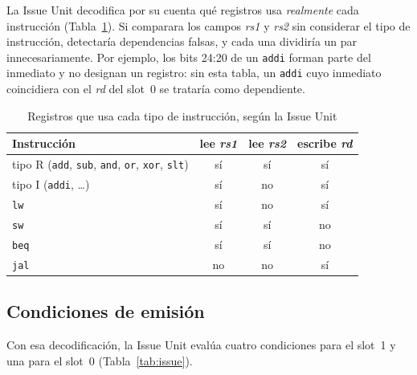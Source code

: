 \documentclass[11pt,a4paper]{article}
\newcommand{\sig}[1]{\textit{#1}}
\newcommand{\ins}[1]{\texttt{#1}}
\begin{document}
La Issue Unit decodifica por su cuenta qué registros usa \emph{realmente} cada instrucción
(Tabla~\ref{tab:use}). Si comparara los campos \sig{rs1} y \sig{rs2} sin considerar el
tipo de instrucción, detectaría dependencias falsas, y cada una dividiría un par
innecesariamente. Por ejemplo, los bits 24:20 de un \ins{addi} forman parte del inmediato
y no designan un registro: sin esta tabla, un \ins{addi} cuyo inmediato coincidiera con el
\sig{rd} del slot~0 se trataría como dependiente.

\begin{table}[htbp]
\centering\small
\caption{Registros que usa cada tipo de instrucción, según la Issue Unit}
\label{tab:use}
\begin{tabular}{@{}lccc@{}}
\toprule
Instrucción & lee \sig{rs1} & lee \sig{rs2} & escribe \sig{rd} \\
\midrule
tipo R (\ins{add}, \ins{sub}, \ins{and}, \ins{or}, \ins{xor}, \ins{slt}) & sí & sí & sí \\
tipo I (\ins{addi}, \dots) & sí & no & sí \\
\ins{lw} & sí & no & sí \\
\ins{sw} & sí & sí & no \\
\ins{beq} & sí & sí & no \\
\ins{jal} & no & no & sí \\
\bottomrule
\end{tabular}
\end{table}

\subsection{Condiciones de emisión}

Con esa decodificación, la Issue Unit evalúa cuatro condiciones para el slot~1 y
una para el slot~0 (Tabla~\ref{tab:issue}).
\end{document}
